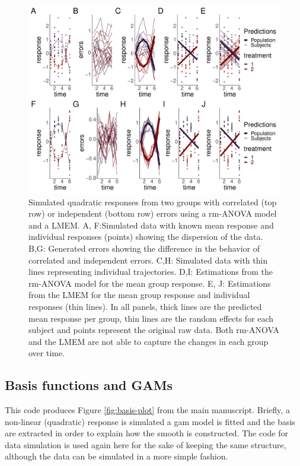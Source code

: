 \documentclass[
]{article}
\begin{document}
\begin{figure}[H]
\includegraphics{00-Full_document_files/figure-latex/quadratic-cases-Appendix-1} \caption{Simulated quadratic responses from two groups with correlated (top row) or independent (bottom row) errors using a rm-ANOVA model and a LMEM. A, F:Simulated data with known mean response and individual responses (points) showing the dispersion of the data. B,G: Generated errors showing the difference in the behavior of correlated and independent errors. C,H: Simulated data with thin lines representing individual trajectories. D,I: Estimations from the rm-ANOVA model for the mean group response. E, J: Estimations from the LMEM for the mean group response and individual responses (thin lines). In all panels, thick lines are the predicted mean response per group, thin lines are the random effects for each subject and points represent the original raw data. Both rm-ANOVA and the LMEM are not able to capture the changes in each group over time.}\label{fig:quadratic-cases-Appendix}
\end{figure}

\hypertarget{basis-functions-and-gams}{%
\subsection{Basis functions and GAMs}\label{basis-functions-and-gams}}

This code produces Figure \ref{fig:basis-plot} from the main manuscript. Briefly, a non-linear (quadratic) response is simulated a gam model is fitted and the basis are extracted in order to explain how the smooth is constructed. The code for data simulation is used again here for the sake of keeping the same structure, although the data can be simulated in a more simple fashion.
\end{document}
